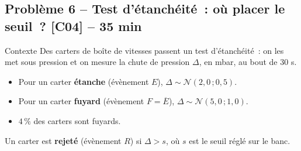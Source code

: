 \documentclass[a4paper,11pt]{article}
\newcommand{\duree}[1]{\hfill{\normalsize\color{uimmred}#1}}
\begin{document}
\newpage
\subsection{Problème 6 -- Test d'étanchéité~: où placer le seuil~? \duree{[C04] -- 35 min}}

\begin{exo}{Contexte}
Des carters de boîte de vitesses passent un test d'étanchéité~: on les met sous pression et on mesure la chute de pression $\Delta$, en mbar, au bout de $30$ s.
\begin{itemize}[leftmargin=12pt, itemsep=1pt, topsep=3pt]
  \item Pour un carter \textbf{étanche} (évènement $E$), $\Delta \sim \mathcal{N}(2{,}0\,;0{,}5)$.
  \item Pour un carter \textbf{fuyard} (évènement $F = \overline{E}$), $\Delta \sim \mathcal{N}(5{,}0\,;1{,}0)$.
  \item $4\,\%$ des carters sont fuyards.
\end{itemize}
Un carter est \textbf{rejeté} (évènement $R$) si $\Delta > s$, où $s$ est le seuil réglé sur le banc.
\end{exo}
\end{document}
